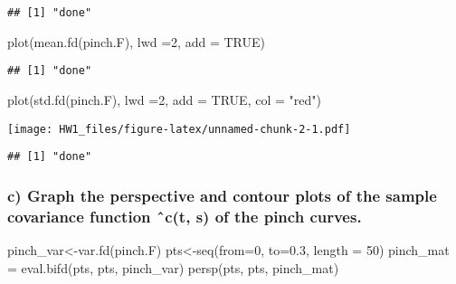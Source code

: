 \documentclass[
]{article}
\newenvironment{Shaded}{\begin{snugshade}}{\end{snugshade}}
\newcommand{\AttributeTok}[1]{\textcolor[rgb]{0.77,0.63,0.00}{#1}}
\newcommand{\ConstantTok}[1]{\textcolor[rgb]{0.00,0.00,0.00}{#1}}
\newcommand{\DecValTok}[1]{\textcolor[rgb]{0.00,0.00,0.81}{#1}}
\newcommand{\FloatTok}[1]{\textcolor[rgb]{0.00,0.00,0.81}{#1}}
\newcommand{\FunctionTok}[1]{\textcolor[rgb]{0.00,0.00,0.00}{#1}}
\newcommand{\NormalTok}[1]{#1}
\newcommand{\OtherTok}[1]{\textcolor[rgb]{0.56,0.35,0.01}{#1}}
\newcommand{\StringTok}[1]{\textcolor[rgb]{0.31,0.60,0.02}{#1}}
\begin{document}
\begin{verbatim}
## [1] "done"
\end{verbatim}

\begin{Shaded}
\begin{Highlighting}[]
\FunctionTok{plot}\NormalTok{(}\FunctionTok{mean.fd}\NormalTok{(pinch.F), }\AttributeTok{lwd =}\DecValTok{2}\NormalTok{, }\AttributeTok{add =} \ConstantTok{TRUE}\NormalTok{)}
\end{Highlighting}
\end{Shaded}

\begin{verbatim}
## [1] "done"
\end{verbatim}

\begin{Shaded}
\begin{Highlighting}[]
\FunctionTok{plot}\NormalTok{(}\FunctionTok{std.fd}\NormalTok{(pinch.F), }\AttributeTok{lwd =}\DecValTok{2}\NormalTok{, }\AttributeTok{add =} \ConstantTok{TRUE}\NormalTok{, }\AttributeTok{col =} \StringTok{"red"}\NormalTok{)}
\end{Highlighting}
\end{Shaded}

\texttt{[image: HW1\_files/figure-latex/unnamed-chunk-2-1.pdf]}

\begin{verbatim}
## [1] "done"
\end{verbatim}

\hypertarget{c-graph-the-perspective-and-contour-plots-of-the-sample-covariance-function-ux2c6ct-s-of-the-pinch-curves.}{%
\subsubsection{c) Graph the perspective and contour plots of the sample
covariance function ˆc(t, s) of the pinch
curves.}\label{c-graph-the-perspective-and-contour-plots-of-the-sample-covariance-function-ux2c6ct-s-of-the-pinch-curves.}}

\begin{Shaded}
\begin{Highlighting}[]
\NormalTok{pinch\_var}\OtherTok{\textless{}{-}}\FunctionTok{var.fd}\NormalTok{(pinch.F)}
\NormalTok{pts}\OtherTok{\textless{}{-}}\FunctionTok{seq}\NormalTok{(}\AttributeTok{from=}\DecValTok{0}\NormalTok{, }\AttributeTok{to=}\FloatTok{0.3}\NormalTok{, }\AttributeTok{length =} \DecValTok{50}\NormalTok{)}
\NormalTok{pinch\_mat }\OtherTok{=} \FunctionTok{eval.bifd}\NormalTok{(pts, pts, pinch\_var)}
\FunctionTok{persp}\NormalTok{(pts, pts, pinch\_mat)}
\end{Highlighting}
\end{Shaded}
\end{document}

